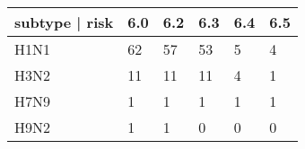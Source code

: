 \begin{tabular}{L{.75in}|L{.25in}|L{.60in}|L{.6in}|L{.6in}|L{.6in}}\hline
subtype | risk&6.0&6.2&6.3&6.4&6.5\\\hline
H1N1&62&57&53&5&4\\
H3N2&11&11&11&4&1\\
H7N9&1&1&1&1&1\\
H9N2&1&1&0&0&0\\
\hline\end{tabular}
